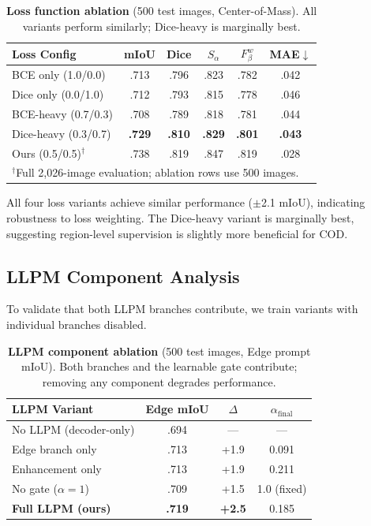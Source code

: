 \begin{table}[t]
\centering
\caption{\textbf{Loss function ablation} (500 test images, Center-of-Mass). All variants perform similarly; Dice-heavy is marginally best.}
\label{tab:ablation_loss}
\small
\begin{tabular}{lccccc}
\toprule
Loss Config & mIoU & Dice & $S_\alpha$ & $F_\beta^w$ & MAE$\downarrow$ \\
\midrule
BCE only (1.0/0.0) & .713 & .796 & .823 & .782 & .042 \\
Dice only (0.0/1.0) & .712 & .793 & .815 & .778 & .046 \\
BCE-heavy (0.7/0.3) & .708 & .789 & .818 & .781 & .044 \\
Dice-heavy (0.3/0.7) & \textbf{.729} & \textbf{.810} & \textbf{.829} & \textbf{.801} & \textbf{.043} \\
\midrule
Ours (0.5/0.5)$^\dagger$ & .738 & .819 & .847 & .819 & .028 \\
\bottomrule
\multicolumn{6}{l}{\footnotesize $^\dagger$Full 2,026-image evaluation; ablation rows use 500 images.}
\end{tabular}
\end{table}

All four loss variants achieve similar performance ($\pm$2.1 mIoU), indicating robustness to loss weighting. The Dice-heavy variant is marginally best, suggesting region-level supervision is slightly more beneficial for COD.

\subsection{LLPM Component Analysis}

To validate that both LLPM branches contribute, we train variants with individual branches disabled.

\begin{table}[t]
\centering
\caption{\textbf{LLPM component ablation} (500 test images, Edge prompt mIoU). Both branches and the learnable gate contribute; removing any component degrades performance.}
\label{tab:ablation_llpm}
\small
\begin{tabular}{lccc}
\toprule
LLPM Variant & Edge mIoU & $\Delta$ & $\alpha_{\text{final}}$ \\
\midrule
No LLPM (decoder-only) & .694 & --- & --- \\
Edge branch only & .713 & +1.9 & 0.091 \\
Enhancement only & .713 & +1.9 & 0.211 \\
No gate ($\alpha\!=\!1$) & .709 & +1.5 & 1.0 (fixed) \\
\textbf{Full LLPM (ours)} & \textbf{.719} & \textbf{+2.5} & 0.185 \\
\bottomrule
\end{tabular}
\end{table}

